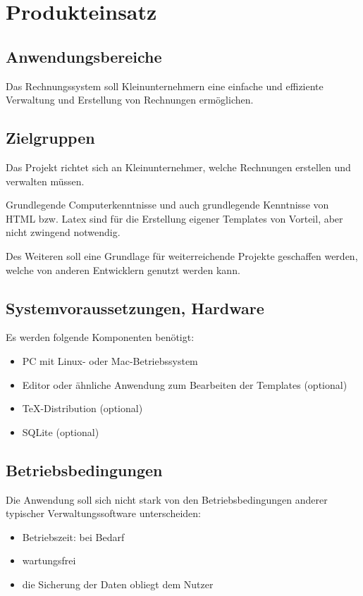 
\section{Produkteinsatz}


\subsection{Anwendungsbereiche}

Das Rechnungssystem soll Kleinunternehmern eine einfache und effiziente Verwaltung und Erstellung von Rechnungen ermöglichen.

\subsection{Zielgruppen}

Das Projekt richtet sich an Kleinunternehmer, welche Rechnungen erstellen und verwalten müssen.

Grundlegende Computerkenntnisse und auch grundlegende Kenntnisse von HTML bzw. Latex sind für die Erstellung eigener Templates von Vorteil, aber nicht zwingend notwendig.

Des Weiteren soll eine Grundlage für weiterreichende Projekte geschaffen werden, welche von anderen Entwicklern genutzt werden kann.

\subsection{Systemvoraussetzungen, Hardware}
Es werden folgende Komponenten benötigt:
\begin{itemize}
	\item PC mit Linux- oder Mac-Betriebssystem
	\item Editor oder ähnliche Anwendung zum Bearbeiten der Templates (optional)
	\item TeX-Distribution (optional)
	\item SQLite (optional)
\end{itemize}

\subsection{Betriebsbedingungen}
Die Anwendung soll sich nicht stark von den Betriebsbedingungen anderer typischer Verwaltungssoftware unterscheiden:

\begin{itemize}
	\item Betriebszeit: bei Bedarf
	\item wartungsfrei
	\item die Sicherung der Daten obliegt dem Nutzer
\end{itemize}
